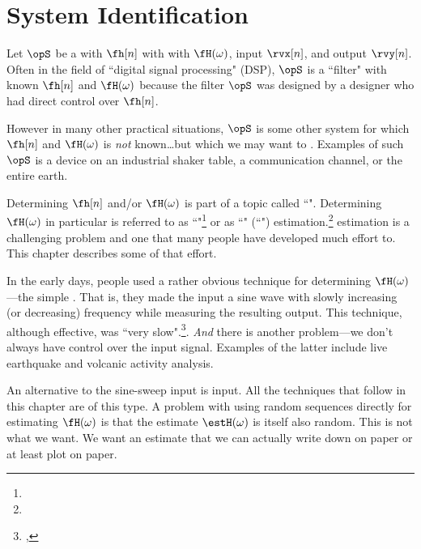 \chapter{System Identification}

Let $\opS$ be a  with  $\fh[n]$ with
with  $\fH(\omega)$,
input $\rvx[n]$, and output $\rvy[n]$. 
Often in the field of ``digital signal processing" (DSP), $\opS$ is a ``filter" 
with known $\fh[n]$ and $\fH(\omega)$ because the filter $\opS$ was 
designed by a designer who had direct control over $\fh[n]$.

However in many other practical situations, $\opS$ is some other system 
for which $\fh[n]$ and $\fH(\omega)$ is \emph{not} known\ldots but which we may
want to . Examples of such $\opS$ is a 
device on an industrial shaker table, a communication channel, or the entire earth.

Determining $\fh[n]$ and/or $\fH(\omega)$ is part of a topic called ``".
Determining $\fH(\omega)$ in particular is referred to as
``"\footnote{}
or as 
``" (``") estimation.\footnote{}
 estimation is a challenging problem and one that
many people have developed much effort to. 
This chapter describes some of that effort.

In the early days, people used a rather obvious technique for determining $\fH(\omega)$---the simple
. That is, they made the input a sine wave with slowly increasing (or decreasing) 
frequency while measuring the resulting output.
This technique, although effective, was ``very slow".\footnote{
  ,
  }.
\emph{And} there is another problem---we don't always have control over the input signal.
Examples of the latter include live earthquake and volcanic activity analysis.

An alternative to the sine-sweep input is  input. 
All the techniques that follow in this chapter are of this type.
A problem with using random sequences directly for estimating $\fH(\omega)$ is that the 
estimate $\estH(\omega)$ is itself also random.
This is not what we want. We want an estimate that we can actually write down 
on paper or at least plot on paper.

